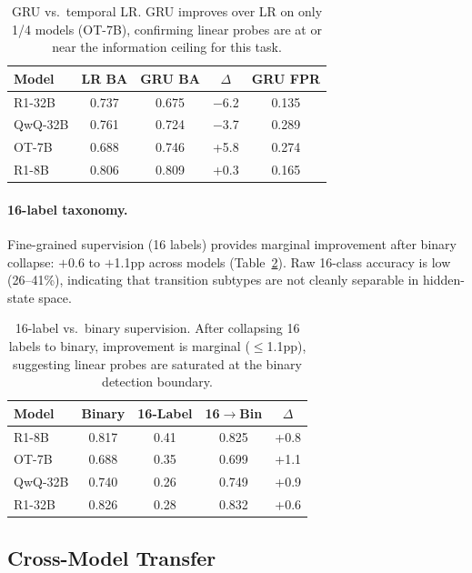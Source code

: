 \documentclass[11pt]{article}
\begin{document}
\begin{table}[t]
\centering
\small
\begin{tabular}{lcccc}
\toprule
\textbf{Model} & \textbf{LR BA} & \textbf{GRU BA} & \textbf{$\Delta$} & \textbf{GRU FPR} \\
\midrule
R1-32B & 0.737 & 0.675 & $-$6.2 & 0.135 \\
QwQ-32B & 0.761 & 0.724 & $-$3.7 & 0.289 \\
OT-7B & 0.688 & 0.746 & +5.8 & 0.274 \\
R1-8B & 0.806 & 0.809 & +0.3 & 0.165 \\
\bottomrule
\end{tabular}
\caption{GRU vs.\ temporal LR. GRU improves over LR on only 1/4 models (OT-7B), confirming linear probes are at or near the information ceiling for this task.}
\label{tab:gru}
\end{table}

\paragraph{16-label taxonomy.}
Fine-grained supervision (16 labels) provides marginal improvement after binary collapse: $+$0.6 to $+$1.1pp across models (Table~\ref{tab:taxonomy}). Raw 16-class accuracy is low (26--41\%), indicating that transition subtypes are not cleanly separable in hidden-state space.

\begin{table}[t]
\centering
\small
\begin{tabular}{lcccc}
\toprule
\textbf{Model} & \textbf{Binary} & \textbf{16-Label} & \textbf{16$\to$Bin} & \textbf{$\Delta$} \\
\midrule
R1-8B & 0.817 & 0.41 & 0.825 & +0.8 \\
OT-7B & 0.688 & 0.35 & 0.699 & +1.1 \\
QwQ-32B & 0.740 & 0.26 & 0.749 & +0.9 \\
R1-32B & 0.826 & 0.28 & 0.832 & +0.6 \\
\bottomrule
\end{tabular}
\caption{16-label vs.\ binary supervision. After collapsing 16 labels to binary, improvement is marginal ($\leq$1.1pp), suggesting linear probes are saturated at the binary detection boundary.}
\label{tab:taxonomy}
\end{table}

\subsection{Cross-Model Transfer}
\end{document}
